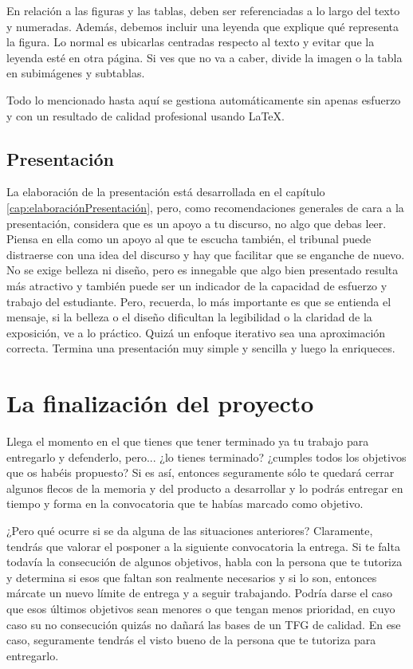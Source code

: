 En relación a las figuras y las tablas, deben ser referenciadas a lo largo  del texto y numeradas. Además, debemos incluir una leyenda que explique qué representa la figura. Lo normal es ubicarlas centradas respecto al texto y evitar que la leyenda esté en otra página. Si ves que no va a caber, divide la imagen o la tabla en subimágenes y subtablas.

Todo lo mencionado hasta aquí se gestiona automáticamente sin apenas esfuerzo y con un resultado de calidad profesional usando \LaTeX.

\subsection{Presentación}

La elaboración de la presentación está desarrollada en el capítulo \ref{cap:elaboraciónPresentación}, pero, como recomendaciones generales de cara a la presentación, considera que es un apoyo a tu discurso, no algo que debas leer. Piensa en ella como un apoyo al que te escucha también, el tribunal puede distraerse con una idea del discurso y hay que facilitar que se enganche de nuevo. No se exige belleza ni diseño, pero es innegable que algo bien presentado resulta más atractivo y también puede ser un indicador de la capacidad de esfuerzo y trabajo del estudiante. Pero, recuerda, lo más importante es que se entienda el mensaje, si la belleza o el diseño dificultan la legibilidad o la claridad de la exposición, ve a lo práctico. Quizá un enfoque iterativo sea una aproximación correcta. Termina una presentación muy simple y sencilla y luego la enriqueces.

\section{La finalización del proyecto}

Llega el momento en el que tienes que tener terminado ya tu trabajo para entregarlo y defenderlo, pero... ¿lo tienes terminado? ¿cumples todos los objetivos que os habéis propuesto? Si es así, entonces seguramente sólo te quedará cerrar algunos flecos de la memoria y del producto a desarrollar y lo podrás entregar en tiempo y forma en la convocatoria que te habías marcado como objetivo.

¿Pero qué ocurre si se da alguna de las situaciones anteriores? Claramente, tendrás que valorar el posponer a la siguiente convocatoria la entrega. Si te falta todavía la consecución de algunos objetivos, habla con la persona que te tutoriza y determina si esos que faltan son realmente necesarios y si lo son, entonces márcate un nuevo límite de entrega y a seguir trabajando. Podría darse el caso que esos últimos objetivos sean menores o que tengan menos prioridad, en cuyo caso su no consecución quizás no dañará las bases de un TFG de calidad. En ese caso, seguramente tendrás el visto bueno de la persona que te tutoriza para entregarlo. 

